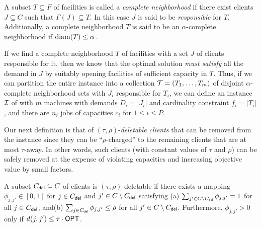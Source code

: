 \begin{definition} \label{def:comp-nbr}
	A subset $T\subseteq F$ of facilities is called a {\em complete neighborhood} if there exist clients $J\subseteq C$ such that $\Gamma(J) \subseteq T$.
	In this case $J$ is said to be {\em responsible} for $T$. Additionally, a complete neighborhood $T$ is said to be an $\alpha$-complete neighborhood if $\mathrm{diam}(T) \leq \alpha$.
\end{definition}

If we find a complete neighborhood $T$ of facilities with a set $J$ of clients responsible for it, then we know that the optimal solution \emph{must satisfy} all the demand in $J$ by suitably opening facilities of sufficient capacity in $T$.
Thus, if we can partition the entire instance into a collection ${\cal T} = (T_1,\ldots,T_m)$ of disjoint $\alpha$-complete neighborhood sets with $J_i$ responsible for $T_i$, we can define an instance ${\cal I}$ of \cckp with $m$ machines with demands $D_i = |J_i|$ and cardinality constraint $f_i = |T_i|$, and there are $n_i$ jobs of capacities $c_i$ for $1 \leq i \leq P$.

Our next definition is that of $(\tau,\rho)$-{\em deletable clients} that can be removed from the instance since they can be ``$\rho$-charged'' to the remaining clients that are at most $\tau$-away. In other words, such clients (with constant values of $\tau$ and $\rho$) can be safely removed at the expense of violating capacities and increasing objective value by 
small factors. 
\begin{definition}\label{def:deletable}
	A subset $C_{\mathsf{del}}\subseteq C$ of clients is $(\tau,\rho)$-deletable if there exists a mapping $\phi_{j,j'}\in [0,1]$ for $j\in C_{\mathsf{del}}$ and $j'\in C\setminus C_{\mathsf{del}}$ satisfying (a) $\sum_{j'\in C\setminus C_{\mathsf{del}}} \phi_{j,j'} = 1$ for all $j\in C_{\mathsf{del}}$, and(b) $\sum_{j\in C_{\mathsf{del}}} \phi_{j,j'} \leq \rho$ for all $j'\in C\setminus C_{\mathsf{del}}$. Furthermore, $\phi_{j,j'} > 0$ only if $d(j,j') \leq \tau\cdot\mathsf{OPT}$.
\end{definition}

